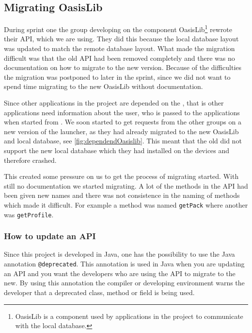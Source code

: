 \subsection{Migrating OasisLib}\label{sec:oasismigration}
During sprint one the group developing on the component OasisLib\footnote{OasisLib is a component used by applications in the \giraf project to communicate with the local database.} rewrote their API, which we are using.
They did this because the local database layout was updated to match the remote database layout.
What made the migration difficult was that the old API had been removed completely and there was no documentation on how to migrate to the new version.
Because of the difficulties the migration was postponed to later in the sprint, since we did not want to spend time migrating to the new OasisLib without documentation.

Since other applications in the \giraf project are depended on the \launcher, that is other applications need information about the user, who is passed to the applications when started from \launcher.
We soon started to get requests from the other groups on a new version of the launcher, as they had already migrated to the new OasisLib and local database, see \cref{fig:dependendOasislib}.
This meant that the old \launcher did not support the new local database which they had installed on the devices and therefore crashed.


This created some pressure on us to get the process of migrating started.
With still no documentation we started migrating. A lot of the methods in the API had been given new names and there was not consistence in the naming of methods which made it difficult.
For example a method was named \lstinline{getPack} where another was \lstinline{getProfile}.

\subsubsection{How to update an API}
Since this project is developed in Java, one has the possibility to use the Java annotation \lstinline{@deprecated}.
This annotation is used in Java when you are updating an API and you want the developers who are using the API to migrate to the new.
By using this annotation the compiler or developing environment warns the developer that a deprecated class, method or field is being used.

